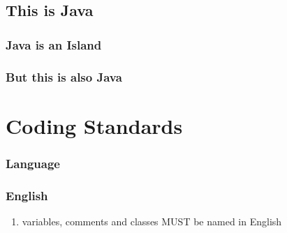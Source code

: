\documentclass[aspectratio=169]{beamer}
\begin{document}
\subsection{This is Java}
\begin{frame}
  \frametitle{Java is an Island}
\end{frame}

\begin{frame}
  \frametitle{But this is also Java}
\end{frame}
\section{Coding Standards}
\subsubsection{Language}
\begin{frame}
  \frametitle{English}

  \begin{enumerate}
    \item variables, comments and classes MUST be named in English
  \end{enumerate}
\end{frame}
\end{document}
